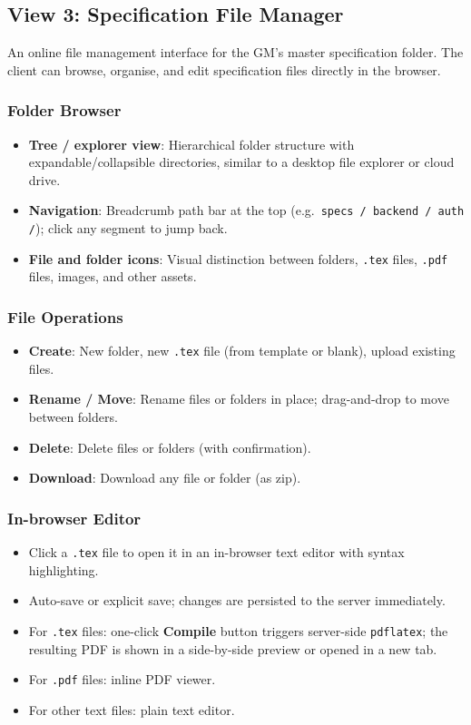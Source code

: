 \documentclass[11pt,a4paper]{article}
\begin{document}
\subsection{View 3: Specification File Manager}

An online file management interface for the GM's master specification folder. The client can browse, organise, and edit specification files directly in the browser.

\subsubsection{Folder Browser}

\begin{itemize}
  \item \textbf{Tree / explorer view}: Hierarchical folder structure with expandable/collapsible directories, similar to a desktop file explorer or cloud drive.
  \item \textbf{Navigation}: Breadcrumb path bar at the top (e.g.\ \texttt{specs / backend / auth /}); click any segment to jump back.
  \item \textbf{File and folder icons}: Visual distinction between folders, \texttt{.tex} files, \texttt{.pdf} files, images, and other assets.
\end{itemize}

\subsubsection{File Operations}

\begin{itemize}
  \item \textbf{Create}: New folder, new \texttt{.tex} file (from template or blank), upload existing files.
  \item \textbf{Rename / Move}: Rename files or folders in place; drag-and-drop to move between folders.
  \item \textbf{Delete}: Delete files or folders (with confirmation).
  \item \textbf{Download}: Download any file or folder (as zip).
\end{itemize}

\subsubsection{In-browser Editor}

\begin{itemize}
  \item Click a \texttt{.tex} file to open it in an in-browser text editor with syntax highlighting.
  \item Auto-save or explicit save; changes are persisted to the server immediately.
  \item For \texttt{.tex} files: one-click \textbf{Compile} button triggers server-side \texttt{pdflatex}; the resulting PDF is shown in a side-by-side preview or opened in a new tab.
  \item For \texttt{.pdf} files: inline PDF viewer.
  \item For other text files: plain text editor.
\end{itemize}
\end{document}
